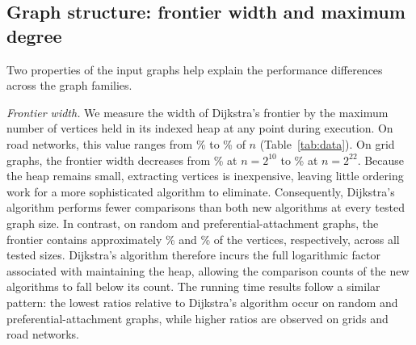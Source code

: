 \subsection{Graph structure: frontier width and maximum degree}\label{sec:structure}
Two properties of the input graphs help explain the performance differences across the graph
families.

\emph{Frontier width.} We measure the width of Dijkstra's frontier by the maximum number of vertices
held in its indexed heap at any point during execution. On road networks, this value ranges from
\RoadPeakMin\% to \RoadPeakMax\% of $n$ (Table~\ref{tab:data}). On grid graphs, the frontier width
decreases from \PeakGridSmall\% at $n=2^{10}$ to \PeakGrid\% at $n=2^{22}$. Because the heap remains
small, extracting vertices is inexpensive, leaving little ordering work for a more sophisticated
algorithm to eliminate. Consequently, Dijkstra's algorithm performs fewer comparisons than both new
algorithms at every tested graph size. In contrast, on random and preferential-attachment graphs,
the frontier contains approximately \PeakRand\% and \PeakBa\% of the vertices, respectively, across
all tested sizes. Dijkstra's algorithm therefore incurs the full logarithmic factor associated with
maintaining the heap, allowing the comparison counts of the new algorithms to fall below its count.
The running time results follow a similar pattern: the lowest ratios relative to Dijkstra's
algorithm occur on random and preferential-attachment graphs, while higher ratios are observed on
grids and road networks.

